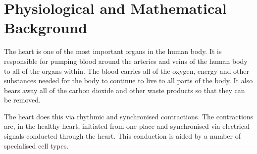 \chapter{Physiological and Mathematical Background}

The heart is one of the most important organs in the human body.
It is responsible for pumping blood around the arteries and veins of the human
body to all of the organs within.
The blood carries all of the oxygen, energy and other substances needed for the
body to continue to live to all parts of the body.
It also bears away all of the carbon dioxide and other waste products so that
they can be removed.

The heart does this via rhythmic and synchronised contractions.
The contractions are, in the healthy heart, initiated from one place and
synchronised via electrical signals conducted through the heart.
This conduction is aided by a number of specialised cell types.







